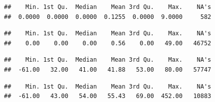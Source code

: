\documentclass[]{article}
\newenvironment{Shaded}{\begin{snugshade}}{\end{snugshade}}
\newcommand{\CommentTok}[1]{\textcolor[rgb]{0.56,0.35,0.01}{\textit{#1}}}
\newcommand{\KeywordTok}[1]{\textcolor[rgb]{0.13,0.29,0.53}{\textbf{#1}}}
\newcommand{\NormalTok}[1]{#1}
\newcommand{\OperatorTok}[1]{\textcolor[rgb]{0.81,0.36,0.00}{\textbf{#1}}}
\begin{document}
\begin{Shaded}
\end{Shaded}

\begin{verbatim}
##    Min. 1st Qu.  Median    Mean 3rd Qu.    Max.    NA's 
##  0.0000  0.0000  0.0000  0.1255  0.0000  9.0000     582
\end{verbatim}

\begin{Shaded}
\end{Shaded}

\begin{verbatim}
##    Min. 1st Qu.  Median    Mean 3rd Qu.    Max.    NA's 
##    0.00    0.00    0.00    0.56    0.00   49.00   46752
\end{verbatim}

\begin{Shaded}
\end{Shaded}

\begin{verbatim}
##    Min. 1st Qu.  Median    Mean 3rd Qu.    Max.    NA's 
##  -61.00   32.00   41.00   41.88   53.00   80.00   57747
\end{verbatim}

\begin{Shaded}
\end{Shaded}

\begin{verbatim}
##    Min. 1st Qu.  Median    Mean 3rd Qu.    Max.    NA's 
##  -61.00   43.00   54.00   55.43   69.00  452.00   10883
\end{verbatim}

\begin{Shaded}
\end{Shaded}
\end{document}
